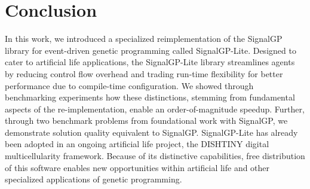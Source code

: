 \section{Conclusion}

In this work, we introduced a specialized reimplementation of the SignalGP library for event-driven genetic programming called SignalGP-Lite.
Designed to cater to artificial life applications, the SignalGP-Lite library streamlines agents by reducing control flow overhead and trading run-time flexibility for better performance due to compile-time configuration.
We showed through benchmarking experiments how these distinctions, stemming from fundamental aspects of the re-implementation, enable an order-of-magnitude speedup.
Further, through two benchmark problems from foundational work with SignalGP, we demonstrate solution quality equivalent to SignalGP.
SignalGP-Lite has already been adopted in an ongoing artificial life project, the DISHTINY digital multicellularity framework.
Because of its distinctive capabilities, free distribution of this software enables new opportunities within artificial life and other specialized applications of genetic programming.

